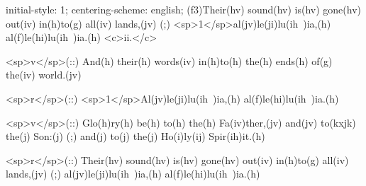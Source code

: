 initial-style: 1;
centering-scheme: english;
(f3)Their(hv) sound(hv) is(hv) gone(hv) out(iv) in(h)to(g) all(iv) lands,(jv) (;) <sp>1</sp>al(jv)le(ji)lu(ih~)ia,(h) al(f)le(hi)lu(ih~)ia.(h) <c>ii.</c>

<sp>v</sp>(::) And(h) their(h) words(iv) in(h)to(h) the(h) ends(h) of(g) the(iv) world.(jv)

<sp>r</sp>(::) <sp>1</sp>Al(jv)le(ji)lu(ih~)ia,(h) al(f)le(hi)lu(ih~)ia.(h)

<sp>v</sp>(::) Glo(h)ry(h) be(h) to(h) the(h) Fa(iv)ther,(jv) and(jv) to(kxjk) the(j) Son:(j) (;) and(j) to(j) the(j) Ho(i)ly(ij) Spir(ih)it.(h)

<sp>r</sp>(::) Their(hv) sound(hv) is(hv) gone(hv) out(iv) in(h)to(g) all(iv) lands,(jv) (;) al(jv)le(ji)lu(ih~)ia,(h) al(f)le(hi)lu(ih~)ia.(h)